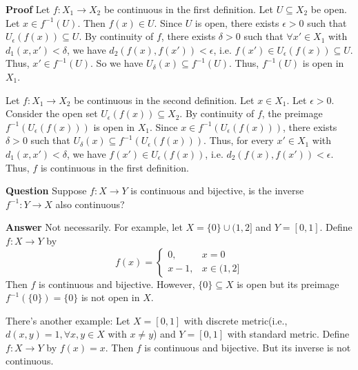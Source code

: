 \documentclass[main.tex]{subfiles}
\begin{document}
\par \noindent \textbf{Proof} Let $f: X_1 \rightarrow X_2$ be continuous in the first definition. Let $U \subseteq X_2$ be open. Let $x \in f^{-1} (U)$. Then $f(x) \in U$. Since $U$ is open, there exists $\epsilon > 0$ such that $U_{\epsilon} (f(x)) \subseteq U$. By continuity of $f$, there exists $\delta > 0$ such that $\forall x' \in X_1$ with $d_1 (x, x') < \delta$, we have $d_2 (f(x), f(x')) < \epsilon$, i.e. $f(x') \in U_{\epsilon} (f(x)) \subseteq U$. Thus, $x' \in f^{-1} (U)$. So we have $U_{\delta} (x) \subseteq f^{-1} (U)$. Thus, $f^{-1} (U)$ is open in $X_1$. 
\par Let $f: X_1 \rightarrow X_2$ be continuous in the second definition. Let $x \in X_1$. Let $\epsilon > 0$. Consider the open set $U_{\epsilon} (f(x)) \subseteq X_2$. By continuity of $f$, the preimage $f^{-1} (U_{\epsilon} (f(x)))$ is open in $X_1$. Since $x \in f^{-1} (U_{\epsilon} (f(x)))$, there exists $\delta > 0$ such that $U_{\delta} (x) \subseteq f^{-1} (U_{\epsilon} (f(x)))$. Thus, for every $x' \in X_1$ with $d_1 (x, x') < \delta$, we have $f(x') \in U_{\epsilon} (f(x))$, i.e. $d_2 (f(x), f(x')) < \epsilon$. Thus, $f$ is continuous in the first definition.
\par \noindent \textbf{Question} Suppose $f: X \rightarrow Y$ is continuous and bijective, is the inverse $f^{-1}: Y \rightarrow X$ also continuous?
\par \noindent \textbf{Answer} Not necessarily. For example, let $X = \{0\} \cup (1, 2]$ and $Y = [0, 1]$. Define $f: X \rightarrow Y$ by
\[f(x) = \begin{cases}
    0, & x = 0 \\
    x - 1, & x \in (1, 2]
\end{cases}\]
Then $f$ is continuous and bijective. However, $\{0\} \subseteq X$ is open but its preimage $f^{-1} (\{0\}) = \{0\}$ is not open in $X$.  
\par There's another example: Let $X = [0, 1]$ with discrete metric(i.e., $d(x, y) = 1, \forall x,y\in X$ with $x\neq y$) and $Y = [0,1]$ with standard metric. Define $f: X \rightarrow Y$ by $f(x) = x$. Then $f$ is continuous and bijective. But its inverse is not continuous. 
\end{document}
